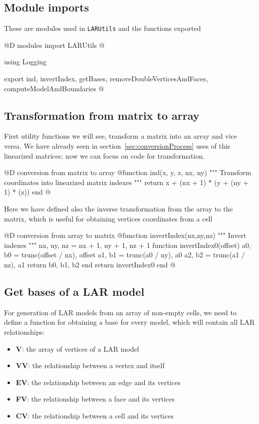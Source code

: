 \documentclass[11pt,oneside]{article}	%
\begin{document}
\subsection{Module imports}\label{sec:LARUtilsImports}

These are modules used in \texttt{LARUtils} and the functions exported

@D modules import LARUtils
@{using Logging

export ind, invertIndex, getBases, removeDoubleVerticesAndFaces,
    computeModelAndBoundaries
@}

\subsection{Transformation from matrix to array}\label{sec:matrixTransform}

First utility functions we will see, transform a matrix into an array and vice versa. We have already seen in section~\ref{sec:conversionProcess} uses of this linearized matrices; now we can focus on code for transformation.

@D conversion from matrix to array
@{function ind(x, y, z, nx, ny)
  """
  Transform coordinates into linearized matrix indexes
  """
  return x + (nx + 1) * (y + (ny + 1) * (z))
end @}

Here we have defined also the inverse transformation from the array to the matrix, which is useful for obtaining vertices coordinates from a cell

@D conversion from array to matrix
@{function invertIndex(nx,ny,nz)
  """
  Invert indexes
  """
  nx, ny, nz = nx + 1, ny + 1, nz + 1
  function invertIndex0(offset)
      a0, b0 = trunc(offset / nx), offset %
      a1, b1 = trunc(a0 / ny), a0 %
      a2, b2 = trunc(a1 / nz), a1 %
      return b0, b1, b2
  end
  return invertIndex0
end @}

\subsection{Get bases of a LAR model}\label{sec:getBases}

For generation of LAR models from an array of non-empty cells, we need to define a function for obtaining a base for every model, which will contain all LAR relationships:
\begin{itemize}
 \item \textbf{V}: the array of vertices of a LAR model
 \item \textbf{VV}: the relationship between a vertex and itself
 \item \textbf{EV}: the relationship between an edge and its vertices
 \item \textbf{FV}: the relationship between a face and its vertices
 \item \textbf{CV}: the relationship between a cell and its vertices
\end{itemize}
\end{document}
